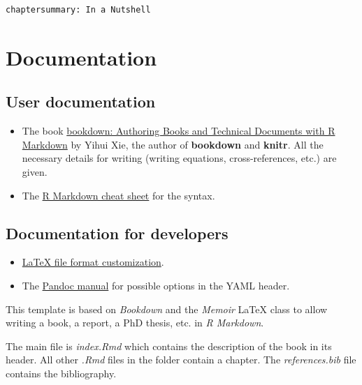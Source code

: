 \documentclass[
  12pt,
  american,
  a4paper,
  extrafontsizes,onecolumn,openright
  ]{memoir}
\providecommand{\tightlist}{%
  \setlength{\itemsep}{0pt}\setlength{\parskip}{0pt}}
\begin{document}
\begin{verbatim}
chaptersummary: In a Nutshell
\end{verbatim}

\hypertarget{documentation}{%
\section{Documentation}\label{documentation}}

\hypertarget{user-documentation}{%
\subsection{User documentation}\label{user-documentation}}

\begin{itemize}
\tightlist
\item
  The book \href{https://bookdown.org/yihui/bookdown/}{bookdown: Authoring Books and Technical Documents with R Markdown} by Yihui Xie, the author of \textbf{bookdown} and \textbf{knitr}.
  All the necessary details for writing (writing equations, cross-references, etc.) are given.
\item
  The \href{https://www.rstudio.com/wp-content/uploads/2015/02/rmarkdown-cheatsheet.pdf}{R Markdown cheat sheet} for the syntax.
\end{itemize}

\hypertarget{documentation-for-developers}{%
\subsection{Documentation for developers}\label{documentation-for-developers}}

\begin{itemize}
\tightlist
\item
  \href{http://rmarkdown.rstudio.com/pdf_document_format.html\#advanced_customization}{LaTeX file format customization}.
\item
  The \href{https://pandoc.org/MANUAL.html}{Pandoc manual} for possible options in the YAML header.
\end{itemize}

This template is based on \emph{Bookdown} and the \emph{Memoir} LaTeX class to allow writing a book, a report, a PhD thesis, etc. in \emph{R Markdown}.

The main file is \emph{index.Rmd} which contains the description of the book in its header. All other \emph{.Rmd} files in the folder contain a chapter.
The \emph{references.bib} file contains the bibliography.
\end{document}
